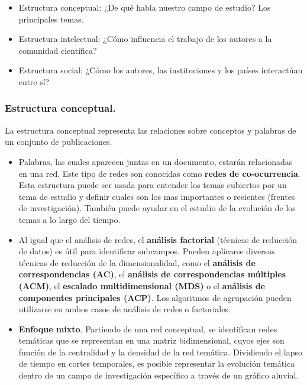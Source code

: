 \documentclass[
]{article}
\providecommand{\tightlist}{%
  \setlength{\itemsep}{0pt}\setlength{\parskip}{0pt}}
\begin{document}
\begin{itemize}
\tightlist
\item
  Estructura conceptual: ¿De qué habla nuestro campo de estudio? Los
  principales temas.
\item
  Estructura intelectual: ¿Cómo influencia el trabajo de los autores a
  la comunidad científica?
\item
  Estructura social: ¿Cómo los autores, las instituciones y los países
  interactúan entre sí?
\end{itemize}

\hypertarget{estructura-conceptual.-1}{%
\subsubsection{Estructura conceptual.}\label{estructura-conceptual.-1}}

La estructura conceptual representa las relaciones sobre conceptos y
palabras de un conjunto de publicaciones.

\begin{itemize}
\item
  Palabras, las cuales aparecen juntas en un documento, estarán
  relacionadas en una red. Este tipo de redes son conocidas como
  \textbf{redes de co-ocurrencia}. Esta estructura puede ser usada para
  entender los temas cubiertos por un tema de estudio y definir cuales
  son los mas importantes o recientes (frentes de investigación).
  También puede ayudar en el estudio de la evolución de los temas a lo
  largo del tiempo.
\item
  Al igual que el análisis de redes, el \textbf{análisis factorial}
  (técnicas de reducción de datos) es útil para identificar subcampos.
  Pueden aplicarse diversas técnicas de reducción de la dimensionalidad,
  como el \textbf{análisis de correspondencias (AC)}, el
  \textbf{análisis de correspondencias múltiples (ACM)}, el
  \textbf{escalado multidimensional (MDS)} o el \textbf{análisis de
  componentes principales (ACP)}. Los algoritmos de agrupación pueden
  utilizarse en ambos casos de análisis de redes o factoriales.
\item
  \textbf{Enfoque mixto}. Partiendo de una red conceptual, se
  identifican redes temáticas que se representan en una matriz
  bidimensional, cuyos ejes son función de la centralidad y la densidad
  de la red temática. Dividiendo el lapso de tiempo en cortes
  temporales, es posible representar la evolución temática dentro de un
  campo de investigación específico a través de un gráfico aluvial.
\end{itemize}
\end{document}

